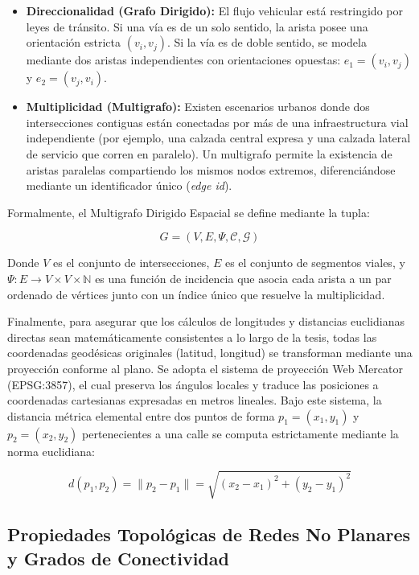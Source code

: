 \begin{itemize}
    \item \textbf{Direccionalidad (Grafo Dirigido):} El flujo vehicular está restringido por leyes de tránsito. Si una vía es de un solo sentido, la arista posee una orientación estricta $(v_i, v_j)$. Si la vía es de doble sentido, se modela mediante dos aristas independientes con orientaciones opuestas: $e_1 = (v_i, v_j)$ y $e_2 = (v_j, v_i)$.
    \item \textbf{Multiplicidad (Multigrafo):} Existen escenarios urbanos donde dos intersecciones contiguas están conectadas por más de una infraestructura vial independiente (por ejemplo, una calzada central expresa y una calzada lateral de servicio que corren en paralelo). Un multigrafo permite la existencia de aristas paralelas compartiendo los mismos nodos extremos, diferenciándose mediante un identificador único (\textit{edge id}).
\end{itemize}

Formalmente, el Multigrafo Dirigido Espacial se define mediante la tupla:

\begin{equation}
G = (V, E, \Psi, \mathcal{C}, \mathcal{G})
\end{equation}

Donde $V$ es el conjunto de intersecciones, $E$ es el conjunto de segmentos viales, y $\Psi: E \rightarrow V \times V \times \mathbb{N}$ es una función de incidencia que asocia cada arista a un par ordenado de vértices junto con un índice único que resuelve la multiplicidad. 

Finalmente, para asegurar que los cálculos de longitudes y distancias euclidianas directas sean matemáticamente consistentes a lo largo de la tesis, todas las coordenadas geodésicas originales (latitud, longitud) se transforman mediante una proyección conforme al plano. Se adopta el sistema de proyección Web Mercator (EPSG:3857), el cual preserva los ángulos locales y traduce las posiciones a coordenadas cartesianas expresadas en metros lineales. Bajo este sistema, la distancia métrica elemental entre dos puntos de forma $p_1=(x_1, y_1)$ y $p_2=(x_2, y_2)$ pertenecientes a una calle se computa estrictamente mediante la norma euclidiana:

\begin{equation}
d(p_1, p_2) = \| p_2 - p_1 \| = \sqrt{(x_2 - x_1)^2 + (y_2 - y_1)^2}
\end{equation}

\subsection{Propiedades Topológicas de Redes No Planares y Grados de Conectividad}
%


